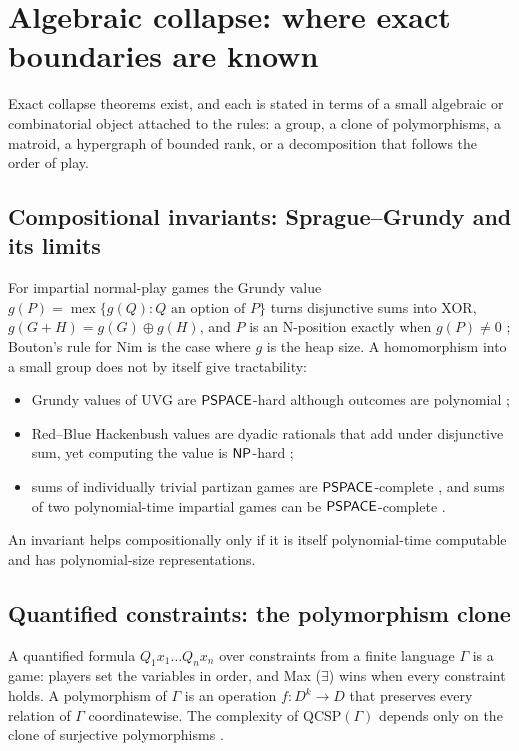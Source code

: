 \section{Algebraic collapse: where exact boundaries are known}\label{sec:algebraic}

Exact collapse theorems exist, and each is stated in terms of a small algebraic or combinatorial object attached to the rules: a group, a clone of polymorphisms, a matroid, a hypergraph of bounded rank, or a decomposition that follows the order of play.

\subsection{Compositional invariants: Sprague--Grundy and its limits}
For impartial normal-play games the Grundy value $g(P)=\operatorname{mex}\{g(Q):Q\text{ an option of }P\}$ turns disjunctive sums into XOR, $g(G+H)=g(G)\oplus g(H)$, and $P$ is an N-position exactly when $g(P)\ne0$ \cite{Sprague,Grundy}; Bouton's rule for Nim \cite{Bouton} is the case where $g$ is the heap size. A homomorphism into a small group does not by itself give tractability:
\begin{itemize}
\item Grundy values of UVG are $\mathsf{PSPACE}$-hard although outcomes are polynomial \cite{BFT};
\item Red--Blue Hackenbush values are dyadic rationals that add under disjunctive sum, yet computing the value is $\mathsf{NP}$-hard \cite{WinningWays,DemaineHearn};
\item sums of individually trivial partizan games are $\mathsf{PSPACE}$-complete \cite{Morris}, and sums of two polynomial-time impartial games can be $\mathsf{PSPACE}$-complete \cite{BFT}.
\end{itemize}
An invariant helps compositionally only if it is itself polynomial-time computable and has polynomial-size representations.

\subsection{Quantified constraints: the polymorphism clone}\label{ssec:qcsp}
A quantified formula $Q_1x_1\dots Q_nx_n$ over constraints from a finite language $\Gamma$ is a game: players set the variables in order, and Max ($\exists$) wins when every constraint holds. A polymorphism of $\Gamma$ is an operation $f\colon D^k\to D$ that preserves every relation of $\Gamma$ coordinatewise. The complexity of $\mathrm{QCSP}(\Gamma)$ depends only on the clone of surjective polymorphisms \cite{BBCJK}.

